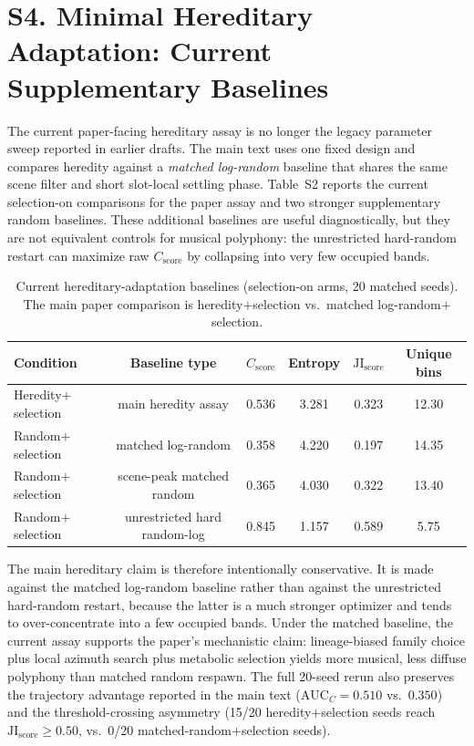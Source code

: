 \documentclass[letterpaper]{article}
\begin{document}
\section{S4. Minimal Hereditary Adaptation: Current Supplementary Baselines}

The current paper-facing hereditary assay is no longer the legacy parameter sweep reported in earlier drafts. The main text uses one fixed design and compares heredity against a \emph{matched log-random} baseline that shares the same scene filter and short slot-local settling phase. Table~S2 reports the current selection-on comparisons for the paper assay and two stronger supplementary random baselines. These additional baselines are useful diagnostically, but they are not equivalent controls for musical polyphony: the unrestricted hard-random restart can maximize raw $C_{\text{score}}$ by collapsing into very few occupied bands.

\begin{table}[t]
\centering
\caption{Current hereditary-adaptation baselines (selection-on arms, 20 matched seeds). The main paper comparison is heredity$+$selection vs.\ matched log-random$+$selection.}
\label{tab:exp4-current}
\footnotesize
\begin{tabular}{@{}lccccc@{}}
\toprule
Condition & Baseline type & $C_{\text{score}}$ & Entropy & $\mathrm{JI}_{\text{score}}$ & Unique bins \\
\midrule
Heredity$+$selection & main heredity assay & 0.536 & 3.281 & 0.323 & 12.30 \\
Random$+$selection & matched log-random & 0.358 & 4.220 & 0.197 & 14.35 \\
Random$+$selection & scene-peak matched random & 0.365 & 4.030 & 0.322 & 13.40 \\
Random$+$selection & unrestricted hard random-log & 0.845 & 1.157 & 0.589 & 5.75 \\
\bottomrule
\end{tabular}
\end{table}

The main hereditary claim is therefore intentionally conservative. It is made against the matched log-random baseline rather than against the unrestricted hard-random restart, because the latter is a much stronger optimizer and tends to over-concentrate into a few occupied bands. Under the matched baseline, the current assay supports the paper's mechanistic claim: lineage-biased family choice plus local azimuth search plus metabolic selection yields more musical, less diffuse polyphony than matched random respawn. The full 20-seed rerun also preserves the trajectory advantage reported in the main text ($\mathrm{AUC}_C = 0.510$ vs.\ $0.350$) and the threshold-crossing asymmetry (15/20 heredity$+$selection seeds reach $\mathrm{JI}_{\text{score}} \ge 0.50$, vs.\ 0/20 matched-random$+$selection seeds).
\end{document}
